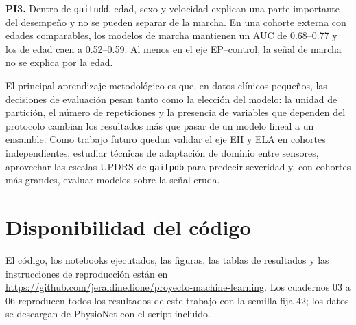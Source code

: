 \documentclass[conference]{IEEEtran}
\newcommand{\gaitndd}{\texttt{gaitndd}}
\newcommand{\gaitpdb}{\texttt{gaitpdb}}
\begin{document}
\textbf{PI3.} Dentro de \gaitndd{}, edad, sexo y velocidad explican una parte importante del desempeño y no se pueden separar de la marcha. En una cohorte externa con edades comparables, los modelos de marcha mantienen un AUC de 0.68--0.77 y los de edad caen a 0.52--0.59. Al menos en el eje EP--control, la señal de marcha no se explica por la edad.

El principal aprendizaje metodológico es que, en datos clínicos pequeños, las decisiones de evaluación pesan tanto como la elección del modelo: la unidad de partición, el número de repeticiones y la presencia de variables que dependen del protocolo cambian los resultados más que pasar de un modelo lineal a un ensamble. Como trabajo futuro quedan validar el eje EH y ELA en cohortes independientes, estudiar técnicas de adaptación de dominio entre sensores, aprovechar las escalas UPDRS de \gaitpdb{} para predecir severidad y, con cohortes más grandes, evaluar modelos sobre la señal cruda.

\section*{Disponibilidad del código}
El código, los notebooks ejecutados, las figuras, las tablas de resultados y las instrucciones de reproducción están en \url{https://github.com/jeraldinedione/proyecto-machine-learning}. Los cuadernos 03 a 06 reproducen todos los resultados de este trabajo con la semilla fija 42; los datos se descargan de PhysioNet con el script incluido.
\end{document}
